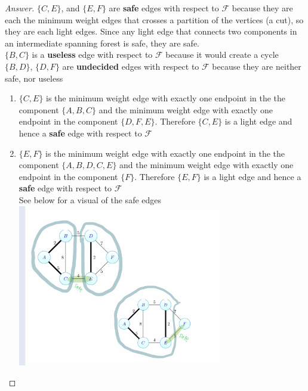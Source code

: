 \documentclass[11pt]{article}
\theoremstyle{definition}
\theoremstyle{definition}
\theoremstyle{definition}
\begin{document}
\begin{proof}[Answer]

 $\{C,E\}$, and $\{E,F\}$ are \textbf{safe} edges with respect to  $\mathcal{F}$ because they are each the minimum weight edges that crosses a partition of the vertices (a cut), so they are each light edges. Since any light edge that connects two components in an intermediate spanning forest is safe, they are safe.  \\
 $\{B,C\}$ is a \textbf{useless} edge with respect to  $\mathcal{F}$ because it would create a cycle \\
$\{B,D\}$, $\{D,F\}$ are \textbf{undecided} edges with respect to  $\mathcal{F}$ because they are neither safe, nor useless \\
\begin{enumerate}
\item $\{C,E\}$ is the minimum weight edge with exactly one endpoint in the the component $\{A,B,C\}$ and the minimum weight edge with exactly one endpoint in the component $\{D,F,E\}$. Therefore $\{C,E\}$ is a light edge and hence a \textbf{safe} edge with respect to  $\mathcal{F}$
\item $\{E,F\}$ is the minimum weight edge with exactly one endpoint in the the component $\{A,B,D,C,E\}$ and the minimum weight edge with exactly one endpoint in the component $\{F\}$. Therefore $\{E,F\}$ is a light edge and hence a \textbf{safe} edge with respect to  $\mathcal{F}$ \\

See below for a visual of the safe edges \\

\includegraphics[width=0.7\textwidth]{q7} \\


\end{enumerate}
\end{proof}
\end{document}
